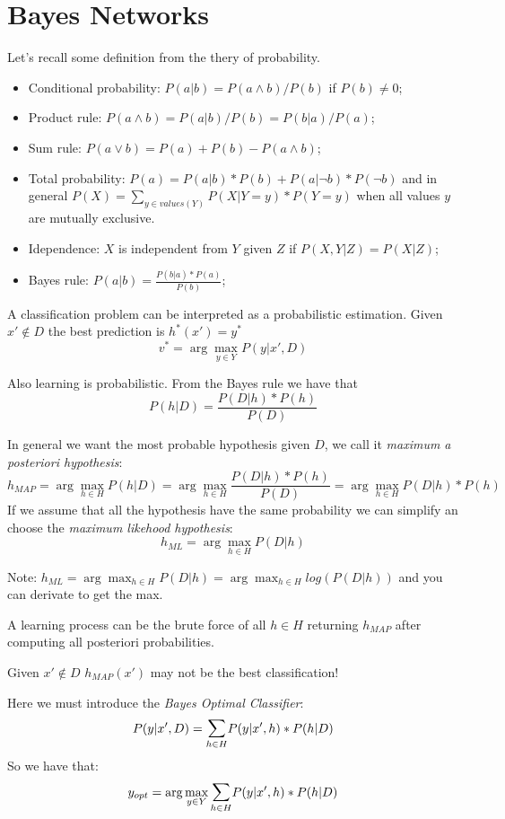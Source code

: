 \section{Bayes Networks}

Let's recall some definition from the thery of probability.

\begin{itemize}
    \item Conditional probability: $P(a|b) = P(a \land b)/P(b)$ if $P(b) \neq 0$;
    \item Product rule: $P(a \land b) = P(a | b)/P(b) = P(b | a)/P(a)$;
    \item Sum rule: $P(a \lor b) = P(a) + P(b) - P(a \land b)$;
    \item Total probability: $P(a) = P(a|b)*P(b)+P(a|\lnot b)*P(\lnot b)$ and in general $P(X) = \sum_{y \in values(Y)} P(X | Y = y)*P(Y = y)$ when all values $y$ are mutually exclusive.
    \item Idependence: $X$ is independent from $Y$ given $Z$ if $P(X,Y|Z) = P(X|Z)$;
    \item Bayes rule: $P(a|b) = \frac{P(b|a)*P(a)}{P(b)}$;
\end{itemize}


A classification problem can be interpreted as a probabilistic estimation. Given $x' \notin D$ the best prediction is $h^*(x') = y^*$
\[
v^* = \arg\max_{y \in Y} P(y | x', D)
\]

Also learning is probabilistic. From the Bayes rule we have that
\[
P(h|D) = \frac{P(D|h)*P(h)}{P(D)}
\]

In general we want the most probable hypothesis given $D$, we call it {\em maximum a posteriori hypothesis}:
\[
h_{MAP} = \arg\max_{h \in H} P(h|D) = \arg\max_{h \in H} \frac{P(D|h)*P(h)}{P(D)} = \arg\max_{h \in H}P(D|h)*P(h)
\]
If we assume that all the hypothesis have the same probability we can simplify an choose the {\em maximum likehood hypothesis}:
\[
h_{ML} = \arg\max_{h \in H} P(D|h)
\]

Note: $h_{ML} = \arg\max_{h \in H} P(D|h) = \arg\max_{h \in H} log(P(D|h))$ and you can derivate to get the max.

A learning process can be the brute force of all $h \in H$ returning $h_{MAP}$ after computing all posteriori probabilities.

Given $x' \notin D$ $h_{MAP}(x')$ may not be the best classification!

Here we must introduce the {\em Bayes Optimal Classifier}:
\[
P(y | x', D) = \mathlarger{\sum}_{h \in H} P(y | x', h)*P(h|D)
\]
So we have that:
\[
y_{opt} = \arg\max_{y \in Y} \mathlarger{\sum}_{h \in H} P(y | x', h)*P(h|D)
\]

